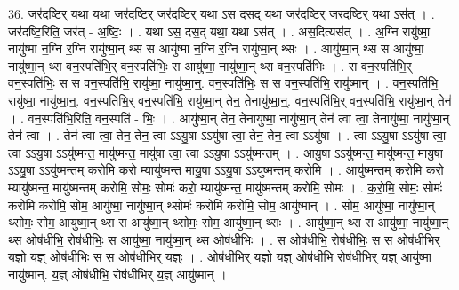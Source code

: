 \documentclass[17pt]{extarticle}
\begin{document}
36. जर॑दष्टि॒र् यथा॒ यथा॒ जर॑दष्टि॒र् जर॑दष्टि॒र् यथा ऽस॒ दस॒द् यथा॒ जर॑दष्टि॒र् जर॑दष्टि॒र् यथा ऽस॑त् । . जर॑दष्टि॒रिति॒ जर॑त् - अ॒ष्टिः॒ । . यथा ऽस॒ दस॒द् यथा॒ यथा ऽस॑त् । . अस॒दित्यस॑त् । . अ॒ग्नि रायु॑ष्मा॒ नायु॑ष्मा न॒ग्नि र॒ग्नि रायु॑ष्मा॒न् थ्स स आयु॑ष्मा न॒ग्नि र॒ग्नि रायु॑ष्मा॒न् थ्सः । . आयु॑ष्मा॒न् थ्स स आयु॑ष्मा॒ नायु॑ष्मा॒न् थ्स वन॒स्पति॑भि॒र् वन॒स्पति॑भिः॒ स आयु॑ष्मा॒ नायु॑ष्मा॒न् थ्स वन॒स्पति॑भिः । . स वन॒स्पति॑भि॒र् वन॒स्पति॑भिः॒ स स वन॒स्पति॑भि॒ रायु॑ष्मा॒ नायु॑ष्मा॒न्॒. वन॒स्पति॑भिः॒ स स वन॒स्पति॑भि॒ रायु॑ष्मान् । . वन॒स्पति॑भि॒ रायु॑ष्मा॒ नायु॑ष्मा॒न्॒. वन॒स्पति॑भि॒र् वन॒स्पति॑भि॒ रायु॑ष्मा॒न् तेन॒ तेनायु॑ष्मा॒न्॒. वन॒स्पति॑भि॒र् वन॒स्पति॑भि॒ रायु॑ष्मा॒न् तेन॑ । . वन॒स्पति॑भि॒रिति॒ वन॒स्पति॑ - भिः॒ । . आयु॑ष्मा॒न् तेन॒ तेनायु॑ष्मा॒ नायु॑ष्मा॒न् तेन॑ त्वा त्वा॒ तेनायु॑ष्मा॒ नायु॑ष्मा॒न् तेन॑ त्वा । . तेन॑ त्वा त्वा॒ तेन॒ तेन॒ त्वा ऽऽयु॒षा ऽऽयु॑षा त्वा॒ तेन॒ तेन॒ त्वा ऽऽयु॑षा । . त्वा ऽऽयु॒षा ऽऽयु॑षा त्वा॒ त्वा ऽऽयु॒षा ऽऽयु॑ष्मन्त॒ मायु॑ष्मन्त॒ मायु॑षा त्वा॒ त्वा ऽऽयु॒षा ऽऽयु॑ष्मन्तम् । . आयु॒षा ऽऽयु॑ष्मन्त॒ मायु॑ष्मन्त॒ मायु॒षा ऽऽयु॒षा ऽऽयु॑ष्मन्तम् करोमि करो॒ म्यायु॑ष्मन्त॒ मायु॒षा ऽऽयु॒षा ऽऽयु॑ष्मन्तम् करोमि । . आयु॑ष्मन्तम् करोमि करो॒ म्यायु॑ष्मन्त॒ मायु॑ष्मन्तम् करोमि॒ सोमः॒ सोमः॑ करो॒ म्यायु॑ष्मन्त॒ मायु॑ष्मन्तम् करोमि॒ सोमः॑ । . क॒रो॒मि॒ सोमः॒ सोमः॑ करोमि करोमि॒ सोम॒ आयु॑ष्मा॒ नायु॑ष्मा॒न् थ्सोमः॑ करोमि करोमि॒ सोम॒ आयु॑ष्मान् । . सोम॒ आयु॑ष्मा॒ नायु॑ष्मा॒न् थ्सोमः॒ सोम॒ आयु॑ष्मा॒न् थ्स स आयु॑ष्मा॒न् थ्सोमः॒ सोम॒ आयु॑ष्मा॒न् थ्सः । . आयु॑ष्मा॒न् थ्स स आयु॑ष्मा॒ नायु॑ष्मा॒न् थ्स ओष॑धीभि॒ रोष॑धीभिः॒ स आयु॑ष्मा॒ नायु॑ष्मा॒न् थ्स ओष॑धीभिः । . स ओष॑धीभि॒ रोष॑धीभिः॒ स स ओष॑धीभिर् य॒ज्ञो य॒ज्ञ् ओष॑धीभिः॒ स स ओष॑धीभिर् य॒ज्ञ्ः । . ओष॑धीभिर् य॒ज्ञो य॒ज्ञ् ओष॑धीभि॒ रोष॑धीभिर् य॒ज्ञ् आयु॑ष्मा॒ नायु॑ष्मान्. य॒ज्ञ् ओष॑धीभि॒ रोष॑धीभिर् य॒ज्ञ् आयु॑ष्मान् । \newline
\end{document}
